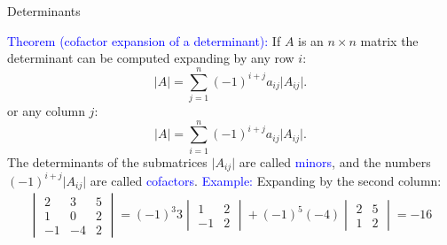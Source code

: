 \documentclass[11pt,aspectratio=169]{beamer}
\begin{document}
\begin{frame}{Determinants}

\textcolor{blue}{Theorem (cofactor expansion of a determinant):} If $A$ is an $n \times n$ matrix the determinant can be computed expanding by any row $i$:
\begin{equation*}
\vert A \vert=\sum_{j=1}^n (-1)^{i+j} a_{ij} \vert A_{ij} \vert.
\end{equation*}
or any column $j$:
\begin{equation*}
\vert A \vert=\sum_{i=1}^n (-1)^{i+j} a_{ij} \vert A_{ij} \vert.
\end{equation*}
The determinants of the submatrices $\vert A_{ij} \vert$ are called \textcolor{blue}{minors}, and the numbers  $(-1)^{i+j} \vert A_{ij} \vert$ are called \textcolor{blue}{cofactors}.
\vskip 10pt
\textcolor{blue}{Example:} Expanding by the second column:
\begin{equation*} \begin{split}
 \begin{vmatrix}
2 & 3 & 5\\
1 & 0 & 2 \\
-1 & -4 & 2
\end{vmatrix}=(-1)^3 3\begin{vmatrix}
1& 2\\
-1& 2
\end{vmatrix} + (-1)^5 (-4) \begin{vmatrix}
2 & 5\\
1 & 2
\end{vmatrix}=-16
\end{split}
\end{equation*}
\end{frame}
\end{document}
